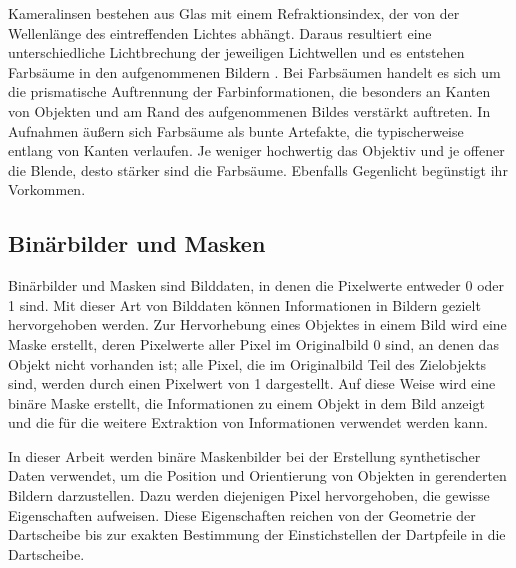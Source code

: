 Kameralinsen bestehen aus Glas mit einem Refraktionsindex, der von der Wellenlänge des eintreffenden Lichtes abhängt. Daraus resultiert eine unterschiedliche Lichtbrechung der jeweiligen Lichtwellen und es entstehen Farbsäume in den aufgenommenen Bildern \cite{lens_distortion, camera_everything}. Bei Farbsäumen handelt es sich um die prismatische Auftrennung der Farbinformationen, die besonders an Kanten von Objekten und am Rand des aufgenommenen Bildes verstärkt auftreten. In Aufnahmen äußern sich Farbsäume als bunte Artefakte, die typischerweise entlang von Kanten verlaufen. Je weniger hochwertig das Objektiv und je offener die Blende, desto stärker sind die Farbsäume. Ebenfalls Gegenlicht begünstigt ihr Vorkommen.


\subsection{Binärbilder und Masken}
\label{sec:masken}

Binärbilder und Masken sind Bilddaten, in denen die Pixelwerte entweder 0 oder 1 sind. Mit dieser Art von Bilddaten können Informationen in Bildern gezielt hervorgehoben werden. Zur Hervorhebung eines Objektes in einem Bild wird eine Maske erstellt, deren Pixelwerte aller Pixel im Originalbild 0 sind, an denen das Objekt nicht vorhanden ist; alle Pixel, die im Originalbild Teil des Zielobjekts sind, werden durch einen Pixelwert von 1 dargestellt. Auf diese Weise wird eine binäre Maske erstellt, die Informationen zu einem Objekt in dem Bild anzeigt und die für die weitere Extraktion von Informationen verwendet werden kann.

In dieser Arbeit werden binäre Maskenbilder bei der Erstellung synthetischer Daten verwendet, um die Position und Orientierung von Objekten in gerenderten Bildern darzustellen. Dazu werden diejenigen Pixel hervorgehoben, die gewisse Eigenschaften aufweisen. Diese Eigenschaften reichen von der Geometrie der Dartscheibe bis zur exakten Bestimmung der Einstichstellen der Dartpfeile in die Dartscheibe.

